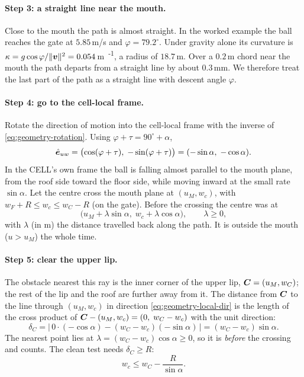 \paragraph{Step 3: a straight line near the mouth.} Close to the mouth the path is almost straight.
In the worked example the ball reaches the gate at $5.85$\,\unit{m/s}\predicted{} and
$\varphi = 79.2^\circ$\predicted. Under gravity alone its curvature is
$\kappa = g\cos\varphi/\lVert\bm{v}\rVert^2 = 0.054$\,\unit{m\textsuperscript{-1}}\derived, a radius
of $18.7$\,\unit{m}\derived. Over a $0.2$\,\unit{m}\assumed{} chord near the mouth the path departs
from a straight line by about $0.3$\,\unit{mm}\derived. We therefore treat the last part of the path as
a straight line with descent angle $\varphi$.

\paragraph{Step 4: go to the cell-local frame.} Rotate the direction of motion into the cell-local
frame with the inverse of \eqref{eq:geometry-rotation}. Using $\varphi + \tau = 90^\circ + \alpha$,
\begin{equation}
  \hat{\bm{e}}_{uw}
  = \bigl(\cos(\varphi+\tau),\; -\sin(\varphi+\tau)\bigr)
  = (-\sin\alpha,\; -\cos\alpha).
  \label{eq:geometry-local-dir}
\end{equation}
In the CELL's own frame the ball is falling almost parallel to the mouth plane, from the roof side
toward the floor side, while moving inward at the small rate $\sin\alpha$. Let the centre cross the
mouth plane at $(u_M, w_c)$, with $w_F + R \le w_c \le w_C - R$ (on the gate). Before the crossing
the centre was at
\begin{equation}
  \bigl(u_M + \lambda\sin\alpha,\; w_c + \lambda\cos\alpha\bigr), \qquad \lambda \ge 0 ,
  \label{eq:geometry-backray}
\end{equation}
with $\lambda$ (in \unit{m}) the distance travelled back along the path. It is outside the mouth
($u > u_M$) the whole time.

\paragraph{Step 5: clear the upper lip.} The obstacle nearest this ray is the inner corner of the
upper lip, $\bm{C} = (u_M, w_C)$; the rest of the lip and the roof are further away from it. The
distance from $\bm{C}$ to the line through $(u_M, w_c)$ in direction \eqref{eq:geometry-local-dir} is
the length of the cross product of $\bm{C} - (u_M, w_c) = (0,\; w_C - w_c)$ with the unit
direction:
\begin{equation}
  \delta_C = \bigl|\,0\cdot(-\cos\alpha) - (w_C - w_c)(-\sin\alpha)\,\bigr| = (w_C - w_c)\sin\alpha .
  \label{eq:geometry-dist-upper}
\end{equation}
The nearest point lies at $\lambda = (w_C - w_c)\cos\alpha \ge 0$, so it is \emph{before} the
crossing and counts. The clean test needs $\delta_C \ge R$:
\begin{equation}
  w_c \le w_C - \frac{R}{\sin\alpha}.
  \label{eq:geometry-upper-cond}
\end{equation}


